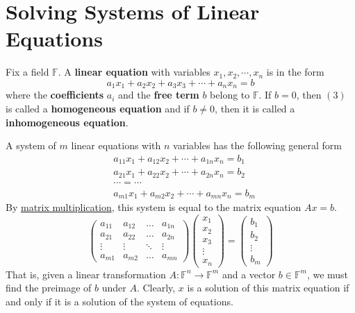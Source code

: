 \section{Solving Systems of Linear Equations}

  \begin{definition}
    \label{def:linear-system-of-equations}
    Fix a field $\mathbb{F}$. A \textbf{linear equation} with variables $x_1, x_2, \cdots, x_n$ is in the form 
    \begin{equation}
      a_1 x_1 + a_2 x_2 + a_3 x_3 + \cdots + a_n x_n = b
    \end{equation}
    where the \textbf{coefficients} $a_i$ and the \textbf{free term} $b$ belong to $\mathbb{F}$. If $b = 0$, then $(3)$ is called a \textbf{homogeneous equation} and if $b \neq 0$, then it is called a \textbf{inhomogeneous equation}. 
  \end{definition}

  A system of $m$ linear equations with $n$ variables has the following general form 
  \begin{align*}
    &a_{1 1} x_1 + a_{1 2} x_2 + \cdots + a_{1 n} x_n = b_1 \\
    &a_{2 1} x_1 + a_{2 2} x_2 + \cdots + a_{2 n} x_n = b_2 \\
    & \cdots = \cdots\\
    &a_{m 1} x_1 + a_{m 2} x_2 + \cdots + a_{m n} x_n = b_m
  \end{align*}
  By \hyperref[def:matrix-multiplication]{matrix multiplication}, this system is equal to the matrix equation $A x = b$.
  \begin{equation}
    \begin{pmatrix}
     a_{1 1} & a_{1 2} & \ldots & a_{1 n} \\
     a_{2 1} & a_{2 2} & \ldots & a_{2 n} \\
     \vdots & \vdots & \ddots & \vdots \\
     a_{m 1} & a_{m 2} & \ldots & a_{m n} 
    \end{pmatrix} \begin{pmatrix}
     x_1 \\ x_2 \\ x_3 \\ \vdots \\ x_n
    \end{pmatrix} = \begin{pmatrix}
    b_1 \\ b_2 \\ \vdots \\ b_m
    \end{pmatrix}
  \end{equation}
  That is, given a linear transformation $A: \mathbb{F}^n \to \mathbb{F}^m$ and a vector $b \in \mathbb{F}^m$, we must find the preimage of $b$ under $A$. Clearly, $x$ is a solution of this matrix equation if and only if it is a solution of the system of equations. 

